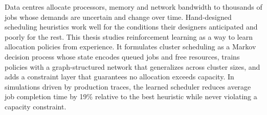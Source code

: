 Data centres allocate processors, memory and network bandwidth to thousands of jobs whose
demands are uncertain and change over time. Hand-designed scheduling heuristics work well for
the conditions their designers anticipated and poorly for the rest. This thesis studies
reinforcement learning as a way to learn allocation policies from experience. It formulates
cluster scheduling as a Markov decision process whose state encodes queued jobs and free
resources, trains policies with a graph-structured network that generalizes across cluster
sizes, and adds a constraint layer that guarantees no allocation exceeds capacity. In
simulations driven by production traces, the learned scheduler reduces average job completion
time by 19\% relative to the best heuristic while never violating a capacity constraint.
